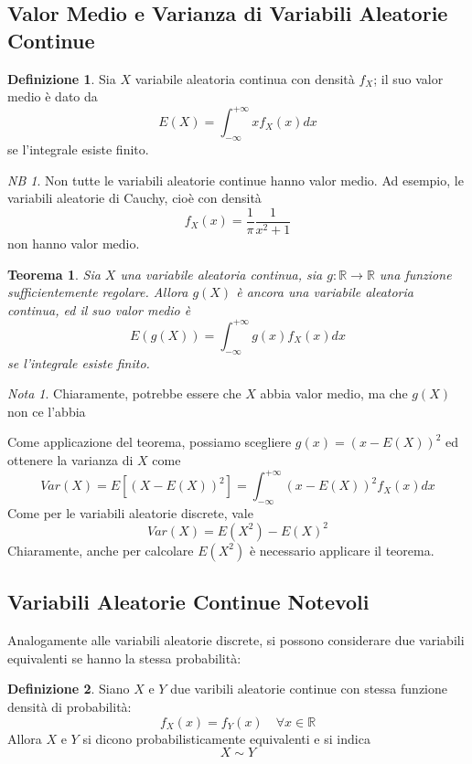 \documentclass{article}
\theoremstyle{plain}
\newtheorem{teorema}{Teorema}[section]
\theoremstyle{definition}
\newtheorem{definizione}{Definizione}[section]
\theoremstyle{remark}
\newtheorem*{nota}{Nota}
\newtheorem*{NB}{NB}
\begin{document}
\subsection{Valor Medio e Varianza di Variabili Aleatorie Continue} %
\label{sub:valor_medio_e_varianza_di_variabili_aleatorie_continue}
\begin{definizione}
	Sia $X$ variabile aleatoria continua con densità $f_X$; il suo valor medio è dato da
	\begin{equation*}
		E(X)=\int_{-\infty}^{+\infty}xf_X(x)dx
	\end{equation*}
	se l'integrale esiste finito.
\end{definizione}
\begin{NB}
	Non tutte le variabili aleatorie continue hanno valor medio. Ad esempio, le variabili aleatorie di Cauchy, cioè con densità
	\begin{equation*}
		f_X(x)=\frac{1}{\pi}\frac{1}{x^2+1}
	\end{equation*}
	non hanno valor medio.
\end{NB}
\begin{teorema}
	Sia $X$ una variabile aleatoria continua, sia $g:\mathds{R}\to\mathds{R}$ una funzione sufficientemente regolare. Allora $g(X)$ è ancora una variabile aleatoria continua, ed il suo valor medio è
	\begin{equation*}
		E(g(X))=\int_{-\infty}^{+\infty}g(x)f_X(x)dx
	\end{equation*}
	se l'integrale esiste finito.
\end{teorema}
\begin{nota}
	Chiaramente, potrebbe essere che $X$ abbia valor medio, ma che $g(X)$ non ce l'abbia
\end{nota}
Come applicazione del teorema, possiamo scegliere $g(x)=(x-E(X))^2$ ed ottenere la varianza di $X$ come
\begin{equation*}
	Var(X)=E[(X-E(X))^2]=\int_{-\infty}^{+\infty}(x-E(X))^2f_X(x)dx
\end{equation*}
Come per le variabili aleatorie discrete, vale
\begin{equation*}
	Var(X)=E(X^2)-E(X)^2
\end{equation*}
Chiaramente, anche per calcolare $E(X^2)$ è necessario applicare il teorema.
\subsection{Variabili Aleatorie Continue Notevoli} %
\label{sub:variabili_aleatorie_continue_notevoli}
Analogamente alle variabili aleatorie discrete, si possono considerare due variabili equivalenti se hanno la stessa probabilità:
\begin{definizione}
	Siano $X$ e $Y$ due varibili aleatorie continue con stessa funzione densità di probabilità:
	\begin{equation*}
		f_X(x)=f_Y(x)\quad\forall x\in\mathds{R}
	\end{equation*}
	Allora $X$ e $Y$ si dicono probabilisticamente equivalenti e si indica
	\begin{equation*}
		X\sim Y
	\end{equation*}
\end{definizione}
\end{document}
